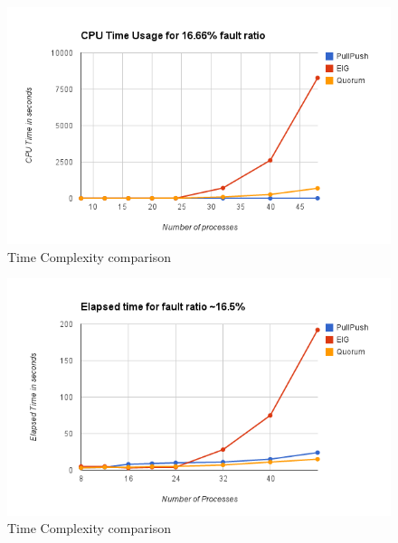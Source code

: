 \begin{figure}[h]
 \centering
\includegraphics[scale=0.4]{cpu16}
\caption{Time Complexity comparison}
 \label{fig:cpu}
\end{figure}

\begin{figure}[h]
 \centering
\includegraphics[scale=0.4]{elapsed16}
\caption{Time Complexity comparison}
 \label{fig:elapsed}
\end{figure}


%


